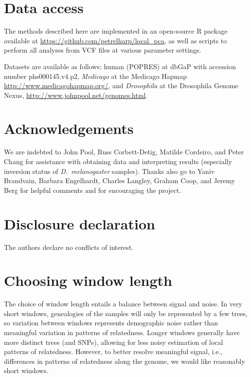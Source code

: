 \documentclass[11pt, oneside]{article}   	%
\begin{document}
\section{Data access}

The methods described here
are implemented in an open-source R package
available at \url{https://github.com/petrelharp/local_pca},
as well as scripts to perform all analyses from VCF files
at various parameter settings.

Datasets are available as follows:
human (POPRES) at dbGaP with accession number phs000145.v4.p2,
\textit{Medicago} at the Medicago Hapmap \url{http://www.medicagohapmap.org/},
and \textit{Drosophila} at the Drosophila Genome Nexus, \url{http://www.johnpool.net/genomes.html}.

\section*{Acknowledgements}

We are indebted to John Pool, Russ Corbett-Detig, Matilde Cordeiro, and Peter Chang 
for assistance with obtaining data and interpreting results
(especially inversion status of \textit{D.~melanogaster} samples).
Thanks also go to Yaniv Brandvain, Barbara Engelhardt, Charles Langley, Graham Coop, and Jeremy Berg for helpful comments
and for encouraging the project.

\section*{Disclosure declaration}

The authors declare no conflicts of interest.


  

\appendix
\setcounter{table}{0}
\renewcommand{\thetable}{S\arabic{table}}
\setcounter{figure}{0}
\renewcommand{\thefigure}{S\arabic{figure}}


\section{Choosing window length}
\label{apx:window_length}

The choice of window length entails a balance between signal and noise.
In very short windows, genealogies of the samples will only be represented by a few trees,
so variation between windows represents demographic noise rather than meaningful variation in patterns of relatedness.
Longer windows generally have more distinct trees (and SNPs), 
allowing for less noisy estimation of local patterns of relatedness.
However, to better resolve meaningful signal, i.e., differences in patterns of relatedness along the genome,
we would like reasonably short windows.
\end{document}
